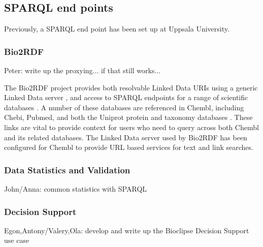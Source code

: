 \documentclass[sw]{iosart2c}
\begin{document}
\subsection{SPARQL end points}

Previously, a SPARQL end point has been set up at Uppsala University.

\subsubsection{Bio2RDF}

Peter: write up the proxying... if that still works...

The Bio2RDF project provides both resolvable Linked Data URIs using a generic Linked Data server \cite{Ansell2011}, and access to SPARQL endpoints for a range of scientific databases \cite{Belleau2008}. A number of these databases are referenced in Chembl, including Chebi, Pubmed, and both the Uniprot protein and taxonomy databases \cite{TheUniProtConsortium2010}. These links are vital to provide context for users who need to query across both Chembl and its related databases. The Linked Data server used by Bio2RDF has been configured for Chembl to provide URL based services for text and link searches.

\subsubsection{Data Statistics and Validation}

John/Anna: common statistics with SPARQL


 

\subsubsection{Decision Support}

Egon,Antony/Valery,Ola: develop and write up the Bioclipse Decision Support use case
\end{document}
